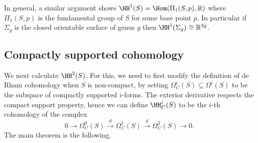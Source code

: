 \begin{remark}
    In general, a similar argument shows
    \(\HH^1(S)=\Hom(\Pi_1(S,p), \mathbb{R})\)
    where \(\Pi_1(S,p)\) is the fundamental group of \(S\) for some base point
    \(p\). In particular if \(\Sigma_g\) is the closed orientable surface of
    genus \(g\) then \(\HH^1(\Sigma_g)\cong \mathbb{R}^{2g}\).
\end{remark}

\subsection{Compactly supported cohomology}
We next calculate \(\HH^2(S)\). For this, we need to first modify the definition
of de Rham cohomology when \(S\) is non-compact, by setting
\(\Omega^i_C(S)\subseteq \Omega^i(S)\) to be the subspace of compactly supported
\(i\)-forms. The exterior derivative respects the compact support property,
hence we can define \(\HH^i_C(S)\) to be the \(i\)-th cohomology of the complex
\[
    0\to \Omega^0_C(S)\xrightarrow{d} \Omega^1_C(S)\xrightarrow{d}
    \Omega^2_C(S)\to 0.
\]
The main theorem is the following.

